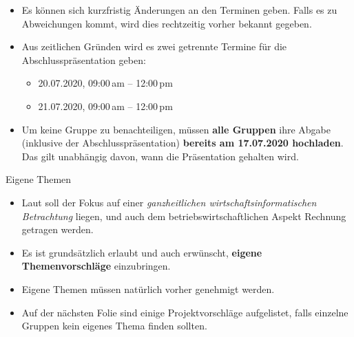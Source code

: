 \begin{frame}
	\begin{itemize}
		\item Es können sich kurzfristig Änderungen an den Terminen geben. Falls es zu Abweichungen kommt, wird dies rechtzeitig vorher bekannt gegeben.
		\item Aus zeitlichen Gründen wird es zwei getrennte Termine für die Abschlusspräsentation geben:
		\begin{itemize}
			\item 20.07.2020, 09:00\,am -- 12:00\,pm
			\item 21.07.2020, 09:00\,am -- 12:00\,pm
		\end{itemize}
		\item Um keine Gruppe zu benachteiligen, müssen \textbf{alle Gruppen} ihre Abgabe (inklusive der Abschlusspräsentation)
			\textbf{bereits am 17.07.2020 hochladen}. Das gilt unabhängig davon, wann die Präsentation gehalten wird.
	\end{itemize}
\end{frame}



\begin{dwHeaderFrame}{Eigene Themen}
	\begin{itemize}
		\item Laut \modulkatalog{} soll der Fokus auf einer \textit{\glqq{}ganzheitlichen wirtschaftsinformatischen Betrachtung\grqq{}} liegen,
			und auch dem betriebswirtschaftlichen Aspekt Rechnung getragen werden.
		\item Es ist grundsätzlich erlaubt und auch erwünscht, \textbf{eigene Themenvorschläge} einzubringen.
		\item Eigene Themen müssen natürlich vorher genehmigt werden.
		\item Auf der nächsten Folie sind einige Projektvorschläge aufgelistet, falls einzelne Gruppen kein eigenes Thema finden sollten.
	\end{itemize}
\end{dwHeaderFrame}

